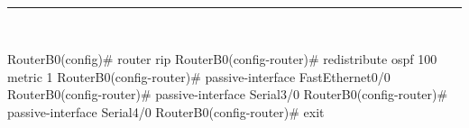 
\begin{center}
	{\fboxrule=4pt } \\
	\setcounter{chapter}{3}
	\setcounter{section}{0}
	\rule{15cm}{0pt} \\
\end{center}



\newpage





\begin{listing}[style=consola]
RouterB0(config)# router rip
RouterB0(config-router)# redistribute ospf 100 metric 1
RouterB0(config-router)# passive-interface FastEthernet0/0
RouterB0(config-router)# passive-interface Serial3/0
RouterB0(config-router)# passive-interface Serial4/0
RouterB0(config-router)# exit
\end{listing}